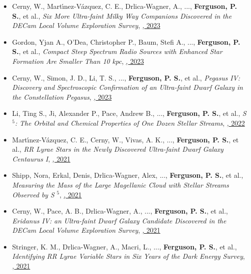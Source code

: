 \begin{itemize}[itemsep=1pt]
    \item {Cerny}, W., {Mart{\'\i}nez-V{\'a}zquez}, C. E., {Drlica-Wagner}, A., ..., \textbf{Ferguson, P. S.}, et al., \textit{{Six More Ultra-faint Milky Way Companions Discovered in the DECam Local Volume Exploration Survey}}, \href{https://ui.adsabs.harvard.edu/abs/2023ApJ...953....1C}{\textbf{\apj}, 2023}
    \item {Gordon}, Yjan A., {O'Dea}, Christopher P., {Baum}, Stefi A., ..., \textbf{Ferguson, P. S.}, et al., \textit{{Compact Steep Spectrum Radio Sources with Enhanced Star Formation Are Smaller Than 10 kpc}}, \href{https://ui.adsabs.harvard.edu/abs/2023ApJ...948L...9G}{\textbf{\apjl}, 2023}
    \item {Cerny}, W., {Simon}, J. D., {Li}, T. S., ..., \textbf{Ferguson, P. S.}, et al., \textit{{Pegasus IV: Discovery and Spectroscopic Confirmation of an Ultra-faint Dwarf Galaxy in the Constellation Pegasus}}, \href{https://ui.adsabs.harvard.edu/abs/2023ApJ...942..111C}{\textbf{\apj}, 2023}
    \item {Li}, Ting S., {Ji}, Alexander P., {Pace}, Andrew B., ..., \textbf{Ferguson, P. S.}, et al., \textit{{S $^{5}$: The Orbital and Chemical Properties of One Dozen Stellar Streams}}, \href{https://ui.adsabs.harvard.edu/abs/2022ApJ...928...30L}{\textbf{\apj}, 2022}
    \item {Mart{\'\i}nez-V{\'a}zquez}, C. E., {Cerny}, W., {Vivas}, A. K., ..., \textbf{Ferguson, P. S.}, et al., \textit{{RR Lyrae Stars in the Newly Discovered Ultra-faint Dwarf Galaxy Centaurus I}}, \href{https://ui.adsabs.harvard.edu/abs/2021AJ....162..253M}{\textbf{\aj}, 2021}
    \item {Shipp}, Nora, {Erkal}, Denis, {Drlica-Wagner}, Alex, ..., \textbf{Ferguson, P. S.}, et al., \textit{{Measuring the Mass of the Large Magellanic Cloud with Stellar Streams Observed by S $^{5}$}}, \href{https://ui.adsabs.harvard.edu/abs/2021ApJ...923..149S}{\textbf{\apj}, 2021}
    \item {Cerny}, W., {Pace}, A. B., {Drlica-Wagner}, A., ..., \textbf{Ferguson, P. S.}, et al., \textit{{Eridanus IV: an Ultra-faint Dwarf Galaxy Candidate Discovered in the DECam Local Volume Exploration Survey}}, \href{https://ui.adsabs.harvard.edu/abs/2021ApJ...920L..44C}{\textbf{\apjl}, 2021}
    \item {Stringer}, K. M., {Drlica-Wagner}, A., {Macri}, L., ..., \textbf{Ferguson, P. S.}, et al., \textit{{Identifying RR Lyrae Variable Stars in Six Years of the Dark Energy Survey}}, \href{https://ui.adsabs.harvard.edu/abs/2021ApJ...911..109S}{\textbf{\apj}, 2021}

\end{itemize}
